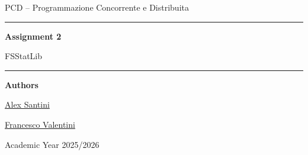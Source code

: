 \begin{titlepage}
    \centering
    \vspace*{2.2cm}

    {\Large PCD -- Programmazione Concorrente e Distribuita\par}
    \vspace{1.2cm}
    {\rule{0.82\textwidth}{0.5pt}\par}
    \vspace{0.9cm}
    {\huge\bfseries Assignment 2\par}
    \vspace{0.35cm}
    {\LARGE FSStatLib\par}
    \vspace{0.45cm}
    \vspace{0.9cm}
    {\rule{0.82\textwidth}{0.5pt}\par}

    \vspace{1.6cm}
    {\large\textbf{Authors}\par}
    \vspace{0.25cm}
    {\large \href{https://github.com/AlexSantini10}{Alex Santini}\par}
    {\large \href{https://github.com/Val0rous}{Francesco Valentini}\par}

    \vfill
    {\large Academic Year 2025/2026\par}
    {\large \todayFullUS\par}
\end{titlepage}
